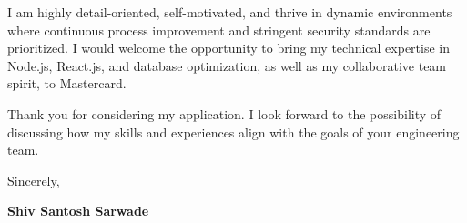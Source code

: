 \documentclass[a4paper,10pt]{article}
\begin{document}
I am highly detail-oriented, self-motivated, and thrive in dynamic environments where continuous process improvement and stringent security standards are prioritized. I would welcome the opportunity to bring my technical expertise in Node.js, React.js, and database optimization, as well as my collaborative team spirit, to Mastercard. 

Thank you for considering my application. I look forward to the possibility of discussing how my skills and experiences align with the goals of your engineering team.

Sincerely,

\vspace{1em}
\textbf{Shiv Santosh Sarwade}
\end{document}
